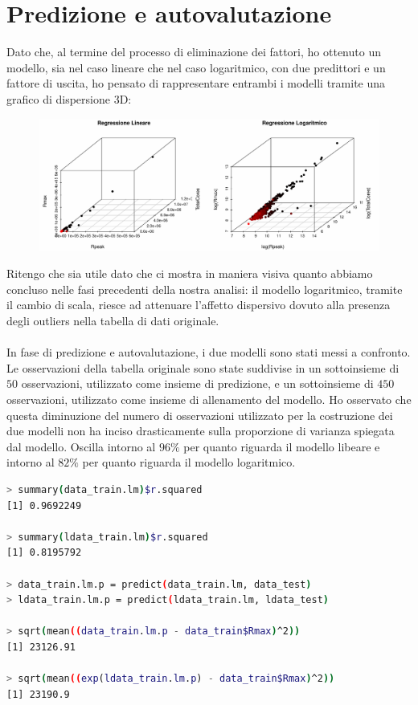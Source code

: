 \documentclass[11pt,a4paper]{article}
\begin{document}
\section{Predizione e autovalutazione}
Dato che, al termine del processo di eliminazione dei fattori, ho ottenuto un
modello, sia nel caso lineare che nel caso logaritmico, con due predittori e un
fattore di uscita, ho pensato di rappresentare entrambi i modelli tramite una
grafico di dispersione 3D:
\begin{figure}[H]
	\begin{center}
		\hspace*{-2.7cm}
		\includegraphics[scale=0.66]{imgs/scatterplot_3d.pdf}
		\vspace{-1cm}
	\end{center}
\end{figure}
\noindent
Ritengo che sia utile dato che ci mostra in maniera visiva quanto abbiamo
concluso nelle fasi precedenti della nostra analisi: il modello logaritmico,
tramite il cambio di scala, riesce ad attenuare l'affetto dispersivo dovuto
alla presenza degli outliers nella tabella di dati originale.\\
\\
In fase di predizione e autovalutazione, i due modelli sono stati messi a
confronto. Le osservazioni della tabella originale sono state suddivise in un
sottoinsieme di $50$ osservazioni, utilizzato come insieme di predizione, e un
sottoinsieme di $450$ osservazioni, utilizzato come insieme di allenamento del
modello. Ho osservato che questa diminuzione del numero di osservazioni
utilizzato per la costruzione dei due modelli non ha inciso drasticamente sulla
proporzione di varianza spiegata dal modello. Oscilla intorno al $96\%$ per
quanto riguarda il modello libeare e intorno al $82\%$ per quanto riguarda il
modello logaritmico.
\begin{lstlisting}[language=bash,basicstyle=\tiny,tabsize=2,frame = single]
> summary(data_train.lm)$r.squared
[1] 0.9692249

> summary(ldata_train.lm)$r.squared
[1] 0.8195792

> data_train.lm.p = predict(data_train.lm, data_test)
> ldata_train.lm.p = predict(ldata_train.lm, ldata_test)

> sqrt(mean((data_train.lm.p - data_train$Rmax)^2))
[1] 23126.91

> sqrt(mean((exp(ldata_train.lm.p) - data_train$Rmax)^2))
[1] 23190.9
\end{lstlisting}
\end{document}

